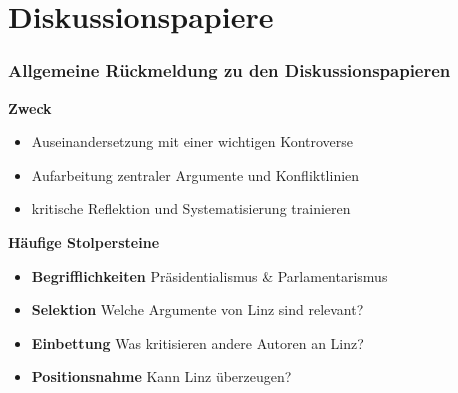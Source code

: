 \documentclass{beamer}
\begin{document}
\section{Diskussionspapiere}

\begin{frame}
\frametitle{Allgemeine Rückmeldung zu den Diskussionspapieren}
\textbf{Zweck}
\begin{itemize}
  \item Auseinandersetzung mit einer wichtigen Kontroverse
  \item Aufarbeitung zentraler Argumente und Konfliktlinien
  \item kritische Reflektion und Systematisierung trainieren
\end{itemize}

\textbf{Häufige Stolpersteine}
\begin{itemize}
  \item \textbf{Begrifflichkeiten} Präsidentialismus \& Parlamentarismus
  \item \textbf{Selektion} Welche Argumente von Linz sind relevant?
  \item \textbf{Einbettung} Was kritisieren andere Autoren an Linz?
  \item \textbf{Positionsnahme} Kann Linz überzeugen?
\end{itemize}
\end{frame}
\end{document}
